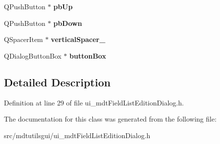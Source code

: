 \begin{DoxyCompactItemize}
\item 
\hypertarget{class_ui__mdt_field_list_edition_dialog_a00ad9846b704acd0dabd77c23184f942}{
QPushButton $\ast$ {\bfseries pbUp}}
\label{class_ui__mdt_field_list_edition_dialog_a00ad9846b704acd0dabd77c23184f942}

\item 
\hypertarget{class_ui__mdt_field_list_edition_dialog_ab2231075e4b0d03e0d3e6549fe58efa8}{
QPushButton $\ast$ {\bfseries pbDown}}
\label{class_ui__mdt_field_list_edition_dialog_ab2231075e4b0d03e0d3e6549fe58efa8}

\item 
\hypertarget{class_ui__mdt_field_list_edition_dialog_a865d7bb493b2ae9c696ebf7f7f5b9b09}{
QSpacerItem $\ast$ {\bfseries verticalSpacer\_}}
\label{class_ui__mdt_field_list_edition_dialog_a865d7bb493b2ae9c696ebf7f7f5b9b09}

\item 
\hypertarget{class_ui__mdt_field_list_edition_dialog_a074a314fc3539819957aac83591d0ae3}{
QDialogButtonBox $\ast$ {\bfseries buttonBox}}
\label{class_ui__mdt_field_list_edition_dialog_a074a314fc3539819957aac83591d0ae3}

\end{DoxyCompactItemize}


\subsection{Detailed Description}


Definition at line 29 of file ui\_\-mdtFieldListEditionDialog.h.



The documentation for this class was generated from the following file:\begin{DoxyCompactItemize}
\item 
src/mdtutilsgui/ui\_\-mdtFieldListEditionDialog.h\end{DoxyCompactItemize}
